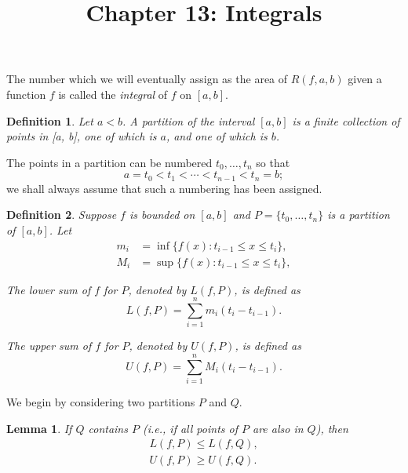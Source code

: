\documentclass{article}
\newtheorem{definition}{Definition}
\newtheorem{lemma}{Lemma}
\begin{document}
\title{Chapter 13: Integrals}
\maketitle

The number which we will eventually assign as the area of $R(f, a, b)$ given a
function $f$ is called the \emph{integral} of $f$ on $[a, b]$.

\begin{definition}
  Let $a < b$. A \emph{partition} of the interval $[a, b]$ is a finite
  collection of points in [a, b], one of which is $a$, and one of which is $b$.
\end{definition}

The points in a partition can be numbered $t_0, \ldots, t_n$ so that
\begin{equation*}
  a = t_0 < t_1 < \cdots < t_{n - 1} < t_n = b;
\end{equation*} we shall always assume that such a numbering has been assigned.

\begin{definition}
  Suppose $f$ is bounded on $[a, b]$ and $P = \{t_0, \ldots, t_n\}$ is a
  partition of $[a, b]$. Let \begin{align*}
    m_i &= \inf\{f(x): t_{i - 1} \leq x \leq t_i\}, \\
    M_i &= \sup\{f(x): t_{i - 1} \leq x \leq t_i\},
  \end{align*}

  The \emph{lower sum} of $f$ for $P$, denoted by $L(f, P)$, is defined as
  \begin{equation*}
    L(f, P) = \sum_{i = 1}^n m_i(t_i - t_{i - 1}).
  \end{equation*}

  The \emph{upper sum} of $f$ for $P$, denoted by $U(f, P)$, is defined as
  \begin{equation*}
    U(f, P) = \sum_{i = 1}^n M_i(t_i - t_{i - 1}).
  \end{equation*}
\end{definition}

We begin by considering two partitions $P$ and $Q$.

\begin{lemma}
  If $Q$ contains $P$ (i.e., if all points of $P$ are also in $Q$), then
  \begin{align*}
    L(f, P) \leq L(f, Q), \\
    U(f, P) \geq U(f, Q).
  \end{align*}
\end{lemma}
\end{document}

